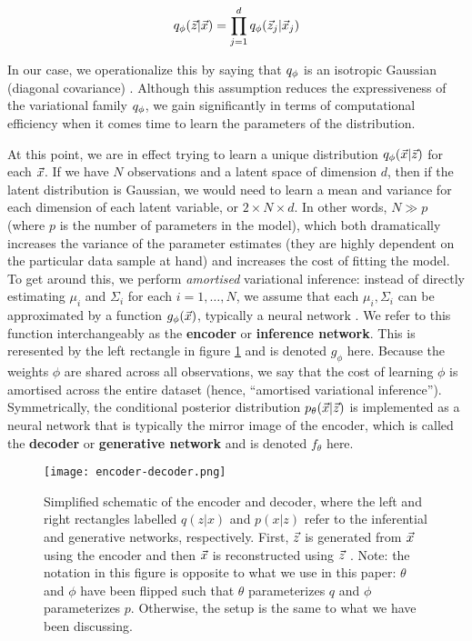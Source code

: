 \begin{align*}
    q_\phi(\vec{z}|\vec{x}) = \prod_{j=1}^dq_\phi(\vec{z}_j|\vec{x}_j)
\end{align*}

In our case, we operationalize this by saying that $q_\phi$ is an isotropic Gaussian (diagonal covariance) \cite{blei2011}. Although this assumption reduces the expressiveness of the variational family $q_\phi$, we gain significantly in terms of computational efficiency when it comes time to learn the parameters of the distribution.

At this point, we are in effect trying to learn a unique distribution $q_\phi(\vec{x}|\vec{z})$ for each $\vec{x}$. If we have $N$ observations and a latent space of dimension $d$, then if the latent distribution is Gaussian, we would need to learn a mean and variance for each dimension of each latent variable, or $2\times N \times d$. In other words, $N\gg p$ (where $p$ is the number of parameters in the model), which both dramatically increases the variance of the parameter estimates (they are highly dependent on the particular data sample at hand) and increases the cost of fitting the model. To get around this, we perform {\it amortised} variational inference: instead of directly estimating $\mu_i$ and $\Sigma_i$ for each $i = 1, \dots, N$, we assume that each $\mu_i, \Sigma_i$ can be approximated by a function $g_\phi(\vec{x})$, typically a neural network \cite{jaanTutorial}. We refer to this function interchangeably as the {\bf encoder} or {\bf inference network}. This is reresented by the left rectangle in figure \ref{fig:encoder-decoder} and is denoted $g_\phi$ here. Because the weights $\phi$ are shared across all observations, we say that the cost of learning $\phi$ is amortised across the entire dataset (hence, ``amortised variational inference''). Symmetrically, the conditional posterior distribution $p_\theta(\vec{x}|\vec{z})$ is implemented as a neural network that is typically the mirror image of the encoder, which is called the {\bf decoder} or {\bf generative network} and is denoted $f_\theta$ here.

\begin{figure}[h]
    \texttt{[image: encoder-decoder.png]}
    \caption{Simplified schematic of the encoder and decoder, where the left and right rectangles labelled $q(z|x)$ and $p(x|z)$ refer to the inferential and generative networks, respectively. First, $\vec{z}$ is generated from $\vec{x}$ using the encoder and then $\vec{x}$ is reconstructed using $\vec{z}$ \cite{jaanTutorial}. Note: the notation in this figure is opposite to what we use in this paper: $\theta$ and $\phi$ have been flipped such that $\theta$ parameterizes $q$ and $\phi$ parameterizes $p$. Otherwise, the setup is the same to what we have been discussing.}
    \label{fig:encoder-decoder}
\end{figure}

